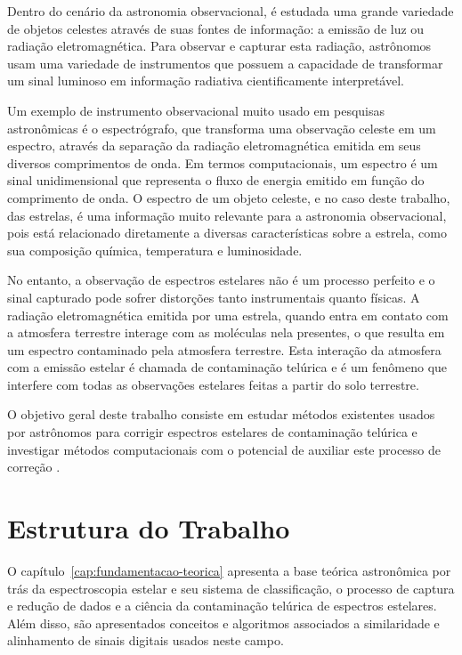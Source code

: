 Dentro do cenário da astronomia observacional, é estudada uma grande variedade de objetos celestes através de suas fontes de informação: a emissão de luz ou radiação eletromagnética. Para observar e capturar esta radiação, astrônomos usam uma variedade de instrumentos que possuem a capacidade de transformar um sinal luminoso em informação radiativa cientificamente interpretável.

Um exemplo de instrumento observacional muito usado em pesquisas astronômicas é o espectrógrafo, que transforma uma observação celeste em um espectro, através da separação da radiação eletromagnética emitida em seus diversos comprimentos de onda. Em termos computacionais, um espectro é um sinal unidimensional que representa o fluxo de energia emitido em função do comprimento de onda. O espectro de um objeto celeste, e no caso deste trabalho, das estrelas, é uma informação muito relevante para a astronomia observacional, pois está relacionado diretamente a diversas características sobre a estrela, como sua composição química, temperatura e luminosidade.

No entanto, a observação de espectros estelares não é um processo perfeito e o sinal capturado pode sofrer distorções tanto instrumentais quanto físicas. A radiação eletromagnética emitida por uma estrela, quando entra em contato com a atmosfera terrestre interage com as moléculas nela presentes, o que resulta em um espectro contaminado pela atmosfera terrestre. Esta interação da atmosfera com a emissão estelar é chamada de contaminação telúrica e é um fenômeno que interfere com todas as observações estelares feitas a partir do solo terrestre.


O objetivo geral deste trabalho consiste em estudar métodos existentes usados por astrônomos para corrigir espectros estelares de contaminação telúrica e investigar métodos computacionais com o potencial de auxiliar este processo de correção .


\section{Estrutura do Trabalho}

O capítulo~\ref{cap:fundamentacao-teorica} apresenta a base teórica astronômica por trás da espectroscopia estelar e seu sistema de classificação, o processo de captura e redução de dados e a ciência da contaminação telúrica de espectros estelares. Além disso, são apresentados conceitos e algoritmos associados a similaridade e alinhamento de sinais digitais usados neste campo.

